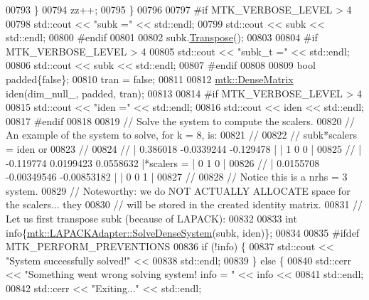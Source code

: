 \begin{DoxyCode}
{{00793     \}
00794     zz++;
00795   \}
00796 
00797 \textcolor{preprocessor}{  #if MTK\_VERBOSE\_LEVEL > 4}
00798   std::cout << \textcolor{stringliteral}{"subk ="} << std::endl;
00799   std::cout << subk << std::endl;
00800 \textcolor{preprocessor}{  #endif}
00801 
00802   subk.\hyperlink{classmtk_1_1DenseMatrix_a71d9c07ca66e88d97d1fd5012f43138b}{Transpose}();
00803 
00804 \textcolor{preprocessor}{  #if MTK\_VERBOSE\_LEVEL > 4}
00805   std::cout << \textcolor{stringliteral}{"subk\_t ="} << std::endl;
00806   std::cout << subk << std::endl;
00807 \textcolor{preprocessor}{  #endif}
00808 
00809   \textcolor{keywordtype}{bool} padded\{\textcolor{keyword}{false}\};
00810   tran = \textcolor{keyword}{false};
00811 
00812   \hyperlink{classmtk_1_1DenseMatrix}{mtk::DenseMatrix} iden(dim\_null\_, padded, tran);
00813 
00814 \textcolor{preprocessor}{  #if MTK\_VERBOSE\_LEVEL > 4}
00815   std::cout << \textcolor{stringliteral}{"iden ="} << std::endl;
00816   std::cout << iden << std::endl;
00817 \textcolor{preprocessor}{  #endif}
00818 
00819   \textcolor{comment}{// Solve the system to compute the scalers.}
00820   \textcolor{comment}{// An example of the system to solve, for k = 8, is:}
00821   \textcolor{comment}{//}
00822   \textcolor{comment}{// subk*scalers = iden or}
00823   \textcolor{comment}{//}
00824   \textcolor{comment}{// |  0.386018  -0.0339244   -0.129478 |           | 1 0 0 |}
00825   \textcolor{comment}{// | -0.119774   0.0199423   0.0558632 |*scalers = | 0 1 0 |}
00826   \textcolor{comment}{// | 0.0155708 -0.00349546 -0.00853182 |           | 0 0 1 |}
00827   \textcolor{comment}{//}
00828   \textcolor{comment}{// Notice this is a nrhs = 3 system.}
00829   \textcolor{comment}{// Noteworthy: we do NOT ACTUALLY ALLOCATE space for the scalers... they}
00830   \textcolor{comment}{// will be stored in the created identity matrix.}
00831   \textcolor{comment}{// Let us first transpose subk (because of LAPACK):}
00832 
00833   \textcolor{keywordtype}{int} info\{\hyperlink{classmtk_1_1LAPACKAdapter_a7428bccf74fd4a4af68fb7233846da22}{mtk::LAPACKAdapter::SolveDenseSystem}(subk, iden)\};
00834 
00835 \textcolor{preprocessor}{  #ifdef MTK\_PERFORM\_PREVENTIONS}
00836   \textcolor{keywordflow}{if} (!info) \{
00837     std::cout << \textcolor{stringliteral}{"System successfully solved!"} <<
00838       std::endl;
00839   \} \textcolor{keywordflow}{else} \{
00840     std::cerr << \textcolor{stringliteral}{"Something went wrong solving system! info = "} << info <<
00841       std::endl;
00842     std::cerr << \textcolor{stringliteral}{"Exiting..."} << std::endl;
}}
\end{DoxyCode}
